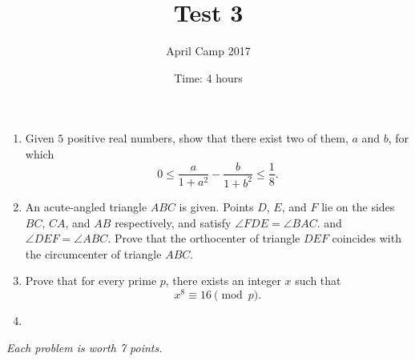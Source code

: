 \documentclass[a4paper,12pt]{article}
\title{Test 3}
\date{Time: 4 hours}
\author{April Camp 2017}
\begin{document}
 \maketitle

\begin{enumerate}
	\item %
	Given $5$ positive real numbers, show that there exist two of them,
	$a$ and $b$, for which
	\[
		0 \leq \frac{a}{1+a^2} - \frac{b}{1+b^2} \leq \frac{1}{8}.
	\]

	\item %
	An acute-angled triangle $ABC$ is given. Points $D$, $E$, and $F$ lie
	on the sides $BC$, $CA$, and $AB$ respectively, and satisfy $\angle
	FDE = \angle BAC$. and $\angle DEF = \angle ABC$. Prove that the
	orthocenter of triangle $DEF$ coincides with the circumcenter of
	triangle $ABC$.

	\item 
	Prove that for every prime $p$, there exists an integer $x$ such that \[x^8 \equiv 16 \pmod p.\]

	\item 

\end{enumerate}

\medskip 

\hfill \emph{Each problem is worth 7 points.}
	
\end{document}
